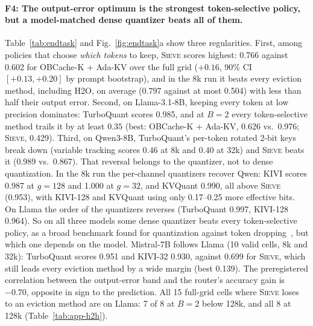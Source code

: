 \documentclass{article}
\newif\ifshowtbd \showtbdtrue
\newcommand{\tbd}[1]{\ifshowtbd{\color{tbdcol}\textbf{TBD}~#1}\else\ifhmode\unskip\fi\fi}
\newcommand{\sieve}{\textsc{Sieve}}
\theoremstyle{definition}
\begin{document}

\paragraph{F4: The output-error optimum is the strongest token-selective policy, but a model-matched dense quantizer beats all of them.}
Table~\ref{tab:endtask} and Fig.~\ref{fig:endtask}a show three regularities.  First, among policies that choose \emph{which tokens} to keep, \sieve{} scores highest: 0.766 against 0.602 for OBCache-K + Ada-KV over the full grid ($+0.16$, 90\% CI $[+0.13,+0.20]$ by prompt bootstrap), and in the 8k run it beats every eviction method, including H2O, on average (0.797 against at most 0.504) with less than half their output error.  Second, on Llama-3.1-8B, keeping every token at low precision dominates: TurboQuant scores 0.985, and at $B=2$ every token-selective method trails it by at least $0.35$ (best: OBCache-K + Ada-KV, 0.626 vs.\ 0.976; \sieve{}, 0.429).  Third, on Qwen3-8B, TurboQuant's per-token rotated 2-bit keys break down (variable tracking scores $0.46$ at 8k and $0.40$ at 32k) and \sieve{} beats it (0.989 vs.\ 0.867).  That reversal belongs to the quantizer, not to dense quantization.  In the 8k run the per-channel quantizers recover Qwen: KIVI scores 0.987 at $g{=}128$ and 1.000 at $g{=}32$, and KVQuant 0.990, all above \sieve{} (0.953), with KIVI-128 and KVQuant using only 0.17--0.25 more effective bits.  On Llama the order of the quantizers reverses (TurboQuant 0.997, KIVI-128 0.964).  So on all three models some dense quantizer beats every token-selective policy, as a broad benchmark found for quantization against token dropping~\citep{yuan2024kvbench}, but which one depends on the model.  Mistral-7B follows Llama (10 valid cells, 8k and 32k): TurboQuant scores 0.951 and KIVI-32 0.930, against 0.699 for \sieve{}, which still leads every eviction method by a wide margin (best 0.139).  The preregistered correlation between the output-error band and the router's accuracy gain is $-0.70$, opposite in sign to the prediction.  All 15 full-grid cells where \sieve{} loses to an eviction method are on Llama: 7 of 8 at $B=2$ below 128k, and all 8 at 128k (Table~\ref{tab:app-h2h}).
\end{document}
